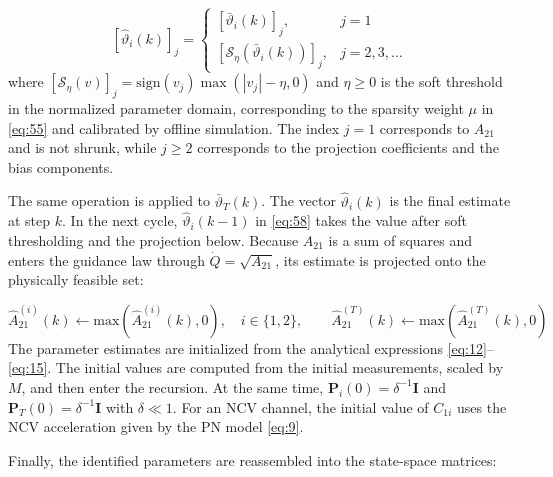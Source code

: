 \begin{equation}
\label{eq:60}
{\left[ {{{\hat \vartheta }_i}(k)} \right]_j} = \left\{ {\begin{array}{*{20}{l}}
  {{{\left[ {{{\bar \vartheta }_i}(k)} \right]}_j},}&{j = 1}\\
  {{{\left[ {{\mathcal{S}_\eta }\left( {{{\bar \vartheta }_i}(k)} \right)} \right]}_j},}&{j = 2,3, \ldots }
\end{array}} \right.
\end{equation}
where ${[{\mathcal{S}_\eta }(v)]_j} = {\text{sign}}({v_j})\max (|{v_j}| - \eta ,0)$ and $\eta  \geqslant 0$ is the soft threshold in the normalized parameter domain, corresponding to the sparsity weight $\mu$ in \eqref{eq:55} and calibrated by offline simulation. The index $j = 1$ corresponds to ${A_{21}}$ and is not shrunk, while $j \geqslant 2$ corresponds to the projection coefficients and the bias components.

The same operation is applied to $\bar{\vartheta}_{T}(k)$. The vector $\hat{\vartheta}_{i}(k)$ is the final estimate at step $k$. In the next cycle, $\hat{\vartheta}_{i}(k - 1)$ in \eqref{eq:58} takes the value after soft thresholding and the projection below. Because ${A_{21}}$ is a sum of squares and enters the guidance law through $\dot Q = \sqrt {{A_{21}}} $, its estimate is projected onto the physically feasible set:

\begin{equation}
\label{eq:61}
\hat A_{21}^{(i)}(k) \leftarrow {\text{max}}(\hat A_{21}^{(i)}(k),0),\quad i \in \{1,2\},\qquad
\hat A_{21}^{(T)}(k) \leftarrow {\text{max}}(\hat A_{21}^{(T)}(k),0)
\end{equation}
The parameter estimates are initialized from the analytical expressions \eqref{eq:12}--\eqref{eq:15}. The initial values are computed from the initial measurements, scaled by $M$, and then enter the recursion. At the same time, ${{\mathbf{P}}_i}(0) = {\delta ^{ - 1}}{\mathbf{I}}$ and ${{\mathbf{P}}_T}(0) = {\delta ^{ - 1}}{\mathbf{I}}$ with $\delta  \ll 1$. For an NCV channel, the initial value of ${C_{1i}}$ uses the NCV acceleration given by the PN model \eqref{eq:9}.

Finally, the identified parameters are reassembled into the state-space matrices:

